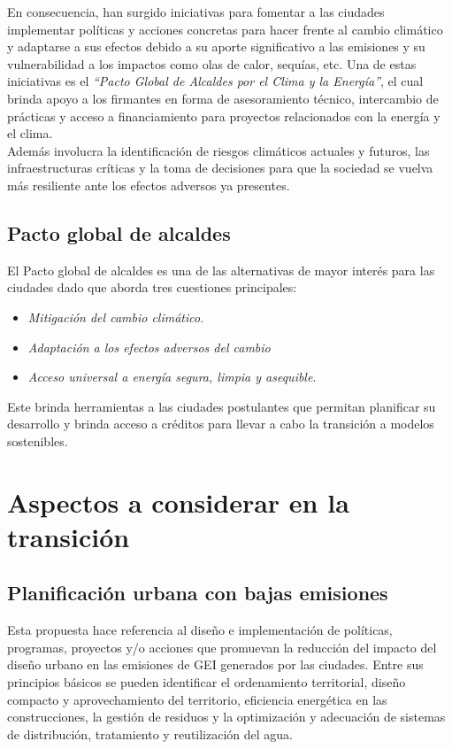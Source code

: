 \documentclass[runningheads]{llncs}
\begin{document}
En consecuencia, han surgido iniciativas para fomentar a las ciudades implementar políticas y acciones concretas para hacer frente al cambio climático y adaptarse a sus efectos debido a su aporte significativo a las emisiones y su vulnerabilidad a los impactos como olas de calor, sequías, etc. Una de estas iniciativas es el \textit{“Pacto Global de Alcaldes por el Clima y la Energía”}, el cual brinda apoyo a los firmantes en forma de asesoramiento técnico, intercambio de prácticas y acceso a financiamiento para proyectos relacionados con la energía y el clima.\\

Además involucra la identificación de riesgos climáticos actuales y futuros, las infraestructuras críticas y la toma de decisiones para que la sociedad se vuelva más resiliente ante los efectos adversos ya presentes.

\subsection{Pacto global de alcaldes }
El Pacto global de alcaldes es una de las alternativas de mayor interés para las ciudades dado que aborda tres cuestiones principales: 
\begin{itemize}
    \item \textit{Mitigación del cambio climático}. 
    \item \textit{Adaptación a los efectos adversos del cambio} 
    \item \textit{Acceso universal a energía segura, limpia y asequible}.~\cite{ref_url2}
\end{itemize}

Este brinda herramientas a las ciudades postulantes que permitan planificar su desarrollo y brinda acceso a créditos para llevar a cabo la transición a modelos sostenibles.


\section{Aspectos a considerar en la transición}
\subsection{Planificación urbana con bajas emisiones}

Esta propuesta hace referencia al diseño e implementación de políticas, programas, proyectos y/o acciones que promuevan la reducción del impacto del diseño urbano en las emisiones de GEI generados por las ciudades. Entre sus principios básicos se pueden identificar el ordenamiento territorial, diseño compacto y aprovechamiento del territorio, eficiencia energética en las construcciones, la gestión de residuos y la optimización y adecuación de sistemas de distribución, tratamiento y reutilización del agua.\\
\end{document}
